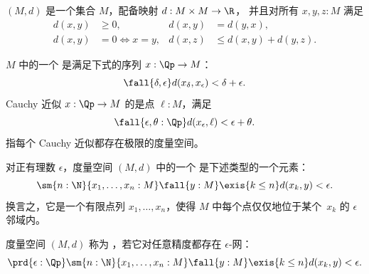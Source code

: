 %

\begin{defn} \label{defn:metric-space}
  $(M, d)$ 是一个集合 $M$，配备映射 $d : M \times M \to \R$，
  并且对所有 $x, y, z : M$ 满足
  \begin{align*}
    d(x,y) &\geq 0, &
    d(x,y) &= d(y,x), \\
    d(x,y) &= 0 \Leftrightarrow x = y, &
    d(x,z) &\leq d(x,y) + d(y,z).
  \end{align*}
\end{defn}

\begin{defn} \label{defn:complete-metric-space}
  $M$ 中的一个
  是满足下式的序列 $x : \Qp \to M$：
  \begin{equation*}
    \fall{\delta, \epsilon} d(x_\delta, x_\epsilon) < \delta + \epsilon.
  \end{equation*}
  Cauchy 近似 $x : \Qp \to M$ 的是点 $\ell : M$，满足
  \begin{equation*}
    \fall{\epsilon, \theta : \Qp} d(x_\epsilon, \ell) < \epsilon + \theta.
  \end{equation*}
  指每个 Cauchy 近似都存在极限的度量空间。
\end{defn}

\begin{defn} \label{defn:total-bounded-metric-space}
  对正有理数 $\epsilon$，度量空间 $(M,
  d)$ 中的一个
  是下述类型的一个元素：
  \begin{equation*}
    \sm{n : \N}{x_1, \ldots, x_n : M}
    \fall{y : M} \exis{k \leq n} d(x_k, y) < \epsilon.
  \end{equation*}
  换言之，它是一个有限点列 $x_1, \ldots, x_n$，使得 $M$ 中每个点仅仅地位于某个~$x_k$ 的 $\epsilon$ 邻域内。

  度量空间 $(M, d)$ 称为
  ，若它对任意精度都存在 $\epsilon$-网：
  \begin{equation*}
    \prd{\epsilon : \Qp}
    \sm{n : \N}{x_1, \ldots, x_n : M}
    \fall{y : M} \exis{k \leq n} d(x_k, y) < \epsilon.
  \end{equation*}
\end{defn}

